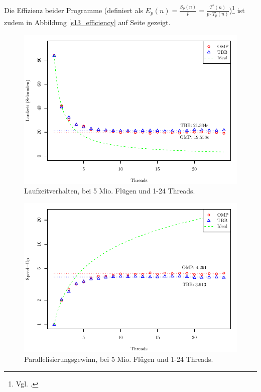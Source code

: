 \documentclass[11pt]{scrartcl}
\begin{document}
Die Effizienz beider Programme (definiert als $E_p(n) = \frac{S_p(n)}{p} =
\frac{T^*(n)}{p \cdot T_p(n)}$)\footnote{Vgl. \cite[S.~164]{rauber_parallel_2010}.} ist zudem in Abbildung
\ref{s13_efficiency} auf Seite \pageref{s13_efficiency} gezeigt.

\begin{figure}[pbt]
\centering
\includegraphics{../messdaten/s13_runtime.pdf}
\caption{Laufzeitverhalten, bei 5 Mio. Flügen und 1-24 Threads.}
\label{s13_runtime}
\end{figure}

\begin{figure}[pbt]
\centering
\includegraphics{../messdaten/s13_speedup.pdf}
\caption{Parallelisierungsgewinn, bei 5 Mio. Flügen und 1-24 Threads.}
\label{s13_speedup}
\end{figure}
\end{document}

